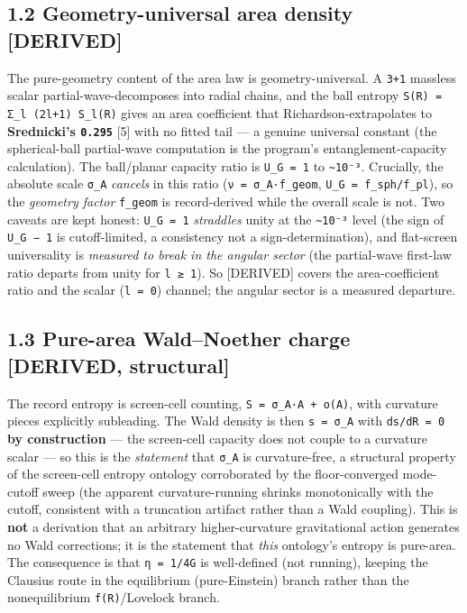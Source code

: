\documentclass[11pt]{article}
\begin{document}
\subsection*{1.2 Geometry-universal area density [DERIVED]}
The pure-geometry content of the area law is geometry-universal. A \texttt{3+1} massless scalar partial-wave-decomposes into radial chains, and the ball entropy \texttt{S(R) = Σ\_l (2l+1) S\_l(R)} gives an area coefficient that Richardson-extrapolates to \textbf{Srednicki's \texttt{0.295}} [5] with no fitted tail — a genuine universal constant (the spherical-ball partial-wave computation is the program's entanglement-capacity calculation). The ball/planar capacity ratio is \texttt{U\_G = 1} to \texttt{\textasciitilde{}10⁻³}. Crucially, the absolute scale \texttt{σ\_A} \emph{cancels} in this ratio (\texttt{ν = σ\_A·f\_geom}, \texttt{U\_G = f\_sph/f\_pl}), so the \emph{geometry factor} \texttt{f\_geom} is record-derived while the overall scale is not. Two caveats are kept honest: \texttt{U\_G = 1} \emph{straddles} unity at the \texttt{\textasciitilde{}10⁻³} level (the sign of \texttt{U\_G − 1} is cutoff-limited, a consistency not a sign-determination), and flat-screen universality is \emph{measured to break in the angular sector} (the partial-wave first-law ratio departs from unity for \texttt{l ≥ 1}). So [DERIVED] covers the area-coefficient ratio and the scalar (\texttt{l = 0}) channel; the angular sector is a measured departure.

\subsection*{1.3 Pure-area Wald–Noether charge [DERIVED, structural]}
The record entropy is screen-cell counting, \texttt{S = σ\_A·A + o(A)}, with curvature pieces explicitly subleading. The Wald density is then \texttt{s = σ\_A} with \texttt{ds/dR = 0} \textbf{by construction} — the screen-cell capacity does not couple to a curvature scalar — so this is the \emph{statement} that \texttt{σ\_A} is curvature-free, a structural property of the screen-cell entropy ontology corroborated by the floor-converged mode-cutoff sweep (the apparent curvature-running shrinks monotonically with the cutoff, consistent with a truncation artifact rather than a Wald coupling). This is \textbf{not} a derivation that an arbitrary higher-curvature gravitational action generates no Wald corrections; it is the statement that \emph{this} ontology's entropy is pure-area. The consequence is that \texttt{η = 1/4G} is well-defined (not running), keeping the Clausius route in the equilibrium (pure-Einstein) branch rather than the nonequilibrium \texttt{f(R)}/Lovelock branch.
\end{document}
